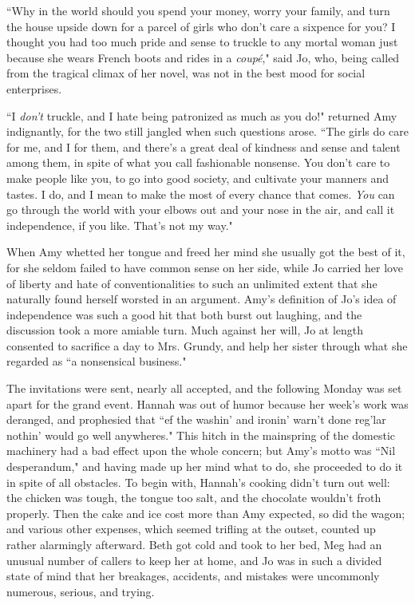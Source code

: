``Why in the world should you spend your money, worry your family, and
turn the house upside down for a parcel of girls who
don't care a sixpence for you? I thought you had too
much pride and sense to truckle to any mortal woman just because she
wears French boots and rides in a \emph{coupé}," said Jo, who, being
called from the tragical climax of her novel, was not in the best mood
for social enterprises.

``I \emph{don't} truckle, and I hate being patronized as
much as you do!" returned Amy indignantly, for the two still jangled
when such questions arose. ``The girls do care for me, and I for them,
and there's a great deal of kindness and sense and
talent among them, in spite of what you call fashionable nonsense. You
don't care to make people like you, to go into good
society, and cultivate your manners and tastes. I do, and I mean to make
the most of every chance that comes. \emph{You} can go through the world
with your elbows out and your nose in the air, and call it independence,
if you like. That's not my way."

When Amy whetted her tongue and freed her mind she usually got the best
of it, for she seldom failed to have common sense on her side, while Jo
carried her love of liberty and hate of conventionalities to such an
unlimited extent that she naturally found herself worsted in an
argument. Amy's definition of Jo's idea
of independence was such a good hit that both burst out laughing, and
the discussion took a more amiable turn. Much against her will, Jo at
length consented to sacrifice a day to Mrs. Grundy, and help her sister
through what she regarded as ``a nonsensical business."

The invitations were sent, nearly all accepted, and the following Monday
was set apart for the grand event. Hannah was out of humor because her
week's work was deranged, and prophesied that ``ef the
washin' and ironin'
warn't done reg'lar
nothin' would go well anywheres." This hitch in the
mainspring of the domestic machinery had a bad effect upon the whole
concern; but Amy's motto was ``Nil desperandum," and
having made up her mind what to do, she proceeded to do it in spite of
all obstacles. To begin with, Hannah's cooking
didn't turn out well: the chicken was tough, the tongue
too salt, and the chocolate wouldn't froth properly.
Then the cake and ice cost more than Amy expected, so did the wagon; and
various other expenses, which seemed trifling at the outset, counted up
rather alarmingly afterward. Beth got cold and took to her bed, Meg had
an unusual number of callers to keep her at home, and Jo was in such a
divided state of mind that her breakages, accidents, and mistakes were
uncommonly numerous, serious, and trying.


